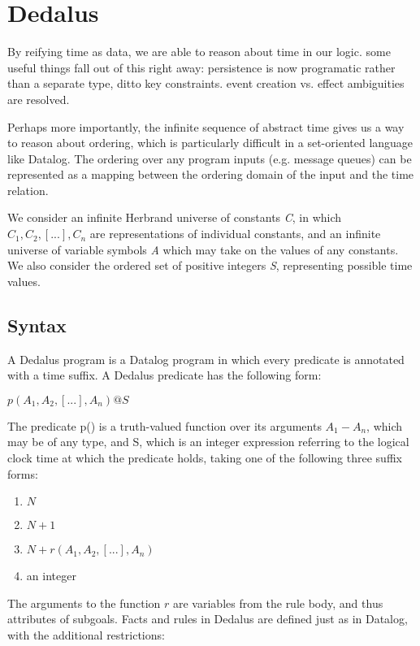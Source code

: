 \section{Dedalus}

By reifying time as data, we are able to reason about time in our logic.  some useful things fall out of this right away: persistence is now programatic rather than a separate type, ditto key constraints.  event creation vs. effect ambiguities are resolved.

Perhaps more importantly, the infinite sequence of abstract time gives us a way to reason about ordering, which is particularly difficult in a set-oriented language like Datalog.  The ordering over any program inputs (e.g. message queues) can be represented as a mapping between the ordering domain of the input and the time relation.

We consider an infinite Herbrand universe of constants \emph{C}, in which $C_{1}, C_{2}, [...], C_{n}$ are representations of individual constants,
and an infinite universe of variable symbols \emph{A} which may take on the values of any constants.   We also consider the ordered set
of positive integers \emph{S}, representing possible time values.

\subsection{Syntax}

A Dedalus program is a Datalog program in which every predicate is annotated with a time suffix.  A Dedalus predicate has the following form:

$p(A_{1}, A_{2}, [...], A_{n})@S$

The predicate p() is a truth-valued function over its arguments $A_{1} - A_{n}$, which may be of any type, and S, which is an integer expression 
referring to the logical clock time at which the predicate holds, taking one of the following three suffix forms:

\begin{enumerate}
\item $N$
\item $N + 1$
\item $N + r(A_{1}, A_{2}, [...], A_{n})$
\item an integer
\end{enumerate}

The arguments to the function $r$ are variables from the rule body, and thus attributes of subgoals.  Facts and rules in Dedalus are 
defined just as in Datalog, with the additional restrictions:

